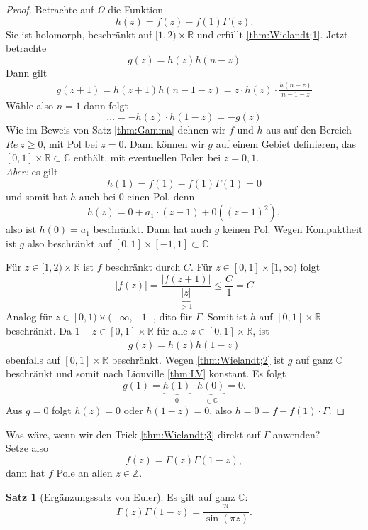 \documentclass[11pt,titlepage]{article}
\theoremstyle{definition}
\newtheorem{theorem}{Satz}[section]
\theoremstyle{remark}
\begin{document}
	\begin{proof}
		Betrachte auf $\Omega$ die Funktion
		\[ h(z)=f(z)-f(1)\Gamma(z). \]
		Sie ist holomorph, beschränkt auf $[1,2)\times\mathbb{R}$ und erfüllt \ref{thm:Wielandt;1}.
		Jetzt betrachte
		\[ g(z)=h(z)h(n-z) \]
		Dann gilt
		\begin{eqnarray}
			g(z+1)=h(z+1)h(n-1-z)=z\cdot h(z)\cdot \frac{h(n-z)}{n-1-z} \label{thm:Wielandt;2}
		\end{eqnarray}
		Wähle also $n=1$ dann folgt
		\[\ldots =- h(z)\cdot h(1-z)=-g(z) \]
		Wie im Beweis von Satz \ref{thm:Gamma} dehnen wir $f$ und $h$ aus auf den Bereich 
		$Re\ z\geq 0$, mit Pol bei $z=0$. Dann können wir $g$ auf einem Gebiet definieren, das $[0,1]\times 
		\mathbb{R}\subset\mathbb{C}$ enthält, mit eventuellen Polen bei $z=0,1$. \\
		\textsl{Aber:} es gilt
		\[ h(1)=f(1)-f(1)\Gamma(1)=0 \]
		und somit hat $h$ auch bei $0$ einen Pol, denn
		\[ h(z)=0+a_1\cdot (z-1)+0((z-1)^2), \]
		also ist $h(0)=a_1$ beschränkt. Dann hat auch $g$ keinen Pol. Wegen Kompaktheit ist $g$ also beschränkt 
		auf $[0,1]\times[-1,1]\subset\mathbb{C}$
		
		
		
		
		Für $z\in [1,2)\times\mathbb{R}$ ist $f$ beschränkt durch $C$. Für $z\in [0,1]\times[1,\infty)$ folgt 
		\[ |f(z)|=\frac{|f(z+1)|}{\underbrace{|z|}_{>1}} \leq \frac{C}{1}=C \]
		Analog für $z\in [0,1)\times (-\infty,-1]$, dito für $\Gamma$. Somit ist $h$ auf $[0,1]\times\mathbb{R}$ 
		beschränkt. Da $1-z\in [0,1]\times\mathbb{R}$ für alle $z\in [0,1]\times\mathbb{R}$, ist 
		\begin{eqnarray}
			g(z)=h(z)h(1-z) \label{thm:Wielandt;3}
		\end{eqnarray}
		ebenfalls auf $[0,1]\times\mathbb{R}$ beschränkt. Wegen \ref{thm:Wielandt;2} ist $g$ 
		auf ganz $\mathbb{C}$ beschränkt und somit nach Liouville \ref{thm:LV} konstant.
		Es folgt
		\[ g(1)=\underbrace{h(1)}_{0}\cdot \underbrace{h(0)}_{\in\mathbb{C}} =0. \]
		Aus $g=0$ folgt $h(z)=0$ oder $h(1-z)=0$, also $h=0=f-f(1)\cdot\Gamma$.
	\end{proof}
	
	Was wäre, wenn wir den Trick \ref{thm:Wielandt;3} direkt auf $\Gamma$ anwenden? \\
	Setze also
	\[ f(z)=\Gamma(z)\Gamma(1-z), \]
	dann hat $f$ Pole an allen $z\in \mathbb{Z}$.
	
	\begin{theorem}[Ergänzungssatz von Euler]\label{thm:Euler}
		Es gilt auf ganz $\mathbb{C}$:
		\[ \Gamma(z)\Gamma(1-z) =\frac{\pi}{\sin(\pi z)}. \]
	\end{theorem}
	
\end{document}
